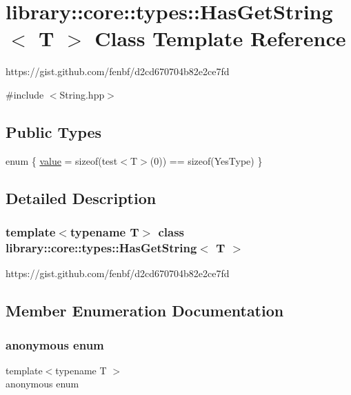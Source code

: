 \hypertarget{classlibrary_1_1core_1_1types_1_1HasGetString}{}\section{library\+:\+:core\+:\+:types\+:\+:Has\+Get\+String$<$ T $>$ Class Template Reference}
\label{classlibrary_1_1core_1_1types_1_1HasGetString}


https\+://gist.github.\+com/fenbf/d2cd670704b82e2ce7fd  




{\ttfamily \#include $<$String.\+hpp$>$}

\subsection*{Public Types}
\begin{DoxyCompactItemize}
\item 
enum \{ \hyperlink{classlibrary_1_1core_1_1types_1_1HasGetString_a081f4360067f3eb25ebdafd63aac3afbaafc31eb372de8416da665553a385b5d7}{value} = sizeof(test$<$T$>$(0)) == sizeof(Yes\+Type)
 \}
\end{DoxyCompactItemize}


\subsection{Detailed Description}
\subsubsection*{template$<$typename T$>$\newline
class library\+::core\+::types\+::\+Has\+Get\+String$<$ T $>$}

https\+://gist.github.\+com/fenbf/d2cd670704b82e2ce7fd 

\subsection{Member Enumeration Documentation}
\mbox{\label{classlibrary_1_1core_1_1types_1_1HasGetString_a081f4360067f3eb25ebdafd63aac3afb}} 
\subsubsection{\texorpdfstring{anonymous enum}{anonymous enum}}
{\footnotesize\ttfamily template$<$typename T $>$ \\
anonymous enum}

